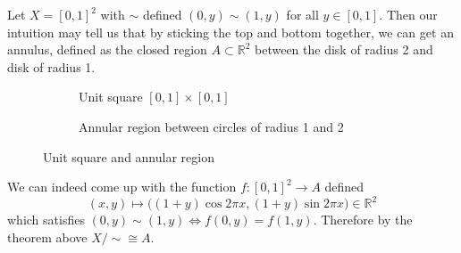     \begin{example}[Annulus]
      Let $X = [0, 1]^2$ with $\sim$ defined $(0, y) \sim (1, y)$ for all $y \in [0, 1]$. Then our intuition may tell us that by sticking the top and bottom together, we can get an annulus, defined as the closed region $A \subset \mathbb{R}^2$ between the disk of radius 2 and disk of radius 1. 

      \begin{figure}[H]
        \centering
        \begin{subfigure}[b]{0.48\textwidth}
          \centering
          \caption{Unit square $[0,1] \times [0,1]$}
          \label{fig:unit-square}
        \end{subfigure}
        \hfill 
        \begin{subfigure}[b]{0.48\textwidth}
          \centering
          \caption{Annular region between circles of radius 1 and 2}
          \label{fig:annular-region}
        \end{subfigure}
        \caption{Unit square and annular region}
        \label{fig:annular_comparison}
      \end{figure} 

      We can indeed come up with the function $f:[0, 1]^2 \rightarrow A$ defined 
      \begin{equation}
        (x, y) \mapsto \big( (1 + y) \cos{2 \pi x}, (1 + y) \sin{2 \pi x} \big) \in \mathbb{R}^2
      \end{equation}
      which satisfies $(0, y) \sim (1, y) \iff f(0, y) = f(1, y)$. Therefore by the theorem above $X/{\sim} \cong A$. 
    \end{example}

